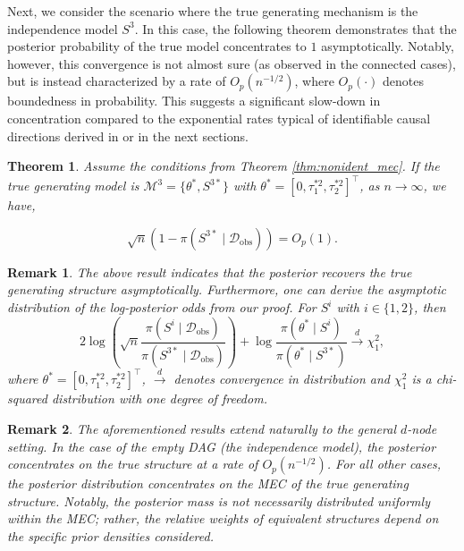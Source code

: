 \documentclass[accepted]{uai2026} %
\newcommand{\train}{\mathcal{D}}
\newcommand{\obsdata}{\train_{\text{obs}}}
\newcommand{\tsone}{\tau_1^{*2}}
\newcommand{\tstwo}{\tau_2^{*2}}
\def\transpose{\intercal}
\theoremstyle{boldremark}
\newtheorem{remark}{Remark}
\newtheorem{theorem}{Theorem}[section]
\begin{document}
Next, we consider the scenario where the true generating mechanism is the independence model $S^3$. In this case, the following theorem demonstrates that the posterior probability of the true model concentrates to $1$ asymptotically. Notably, however, this convergence is not almost sure (as observed in the connected cases), but is instead characterized by a rate of $O_p(n^{-1/2})$, where $O_p(\cdot)$ denotes boundedness in probability. This suggests a significant slow-down in concentration compared to the exponential rates typical of identifiable causal directions derived in \citet{lungu2025bayesiancausaldiscoveryposterior}or in the next sections.

\begin{theorem}
    \label{thm:non_ident_S3}
    Assume the conditions from Theorem \ref{thm:nonident_mec}. If the true generating model is $\mathcal{M}^3 = \{\theta^*, S^{3*}\}$ with $\theta^* = [0, \tsone, \tstwo]^\transpose$, as $n\to\infty$, we have,

    $$\sqrt{n}(1-\pi(S^{3*}\mid \obsdata)) = O_p(1).$$
\end{theorem}


\begin{remark}
\label{remark:log_posterior_chi}
    The above result indicates that the posterior recovers the true generating structure asymptotically. Furthermore, one can derive the asymptotic distribution of the log-posterior odds from our proof. For $S^i$ with $i \in \{1,2\}$, then
    \begin{equation}
        \label{eq:conv_to_chi_sq}
        2\log\left(\sqrt{n}\frac{\pi(S^i \mid \obsdata)}{\pi(S^{3*} \mid \obsdata) }\right) + \log \frac{\pi(\theta^* \mid S^i)}{\pi(\theta^* \mid S^{3*})} \xrightarrow{d} \chi_1^2,
    \end{equation}
    where $\theta^* = [0, \tsone, \tstwo]^\transpose$, $\xrightarrow{d}$ denotes convergence in distribution and $\chi_1^2$ is a chi-squared distribution with one degree of freedom.
\end{remark}

\begin{remark}
    The aforementioned results extend naturally to the general $d$-node setting. In the case of the empty DAG (the independence model), the posterior concentrates on the true structure at a rate of $O_p(n^{-1/2})$. For all other cases, the posterior distribution concentrates on the MEC of the true generating structure. Notably, the posterior mass is not necessarily distributed uniformly within the MEC; rather, the relative weights of equivalent structures depend on the specific prior densities considered.
\end{remark}
\end{document}
